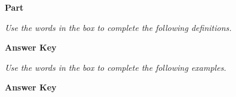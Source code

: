 \documentclass[../Exercise.tex]{subfiles}
\begin{document}
\begin{center}
	\large{\textbf{Part }}
\end{center} 

\noindent \textit{Use the words in the box to complete the following definitions.}

\begin{framed}
\end{framed}
\vspace{7ex}
\begin{framed}
\textbf{Answer Key}
\begin{multicols*}{3}
\end{multicols*}
\end{framed}
\vspace{7ex}

\noindent \textit{Use the words in the box to complete the following examples.}


\begin{framed}
\end{framed}
\vspace{7ex}
\begin{framed}
\textbf{Answer Key}
\begin{multicols*}{4}
\end{multicols*}
\end{framed}
\vspace{7ex}
\end{document}
